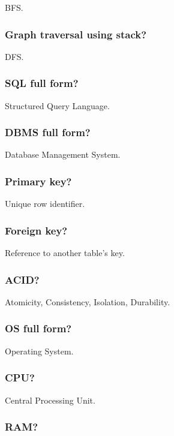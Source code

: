 BFS.

\subsubsection{Graph traversal using stack?}

DFS.

\subsubsection{SQL full form?}

Structured Query Language.

\subsubsection{DBMS full form?}

Database Management System.

\subsubsection{Primary key?}

Unique row identifier.

\subsubsection{Foreign key?}

Reference to another table's key.

\subsubsection{ACID?}

Atomicity, Consistency, Isolation, Durability.

\subsubsection{OS full form?}

Operating System.

\subsubsection{CPU?}

Central Processing Unit.

\subsubsection{RAM?}

